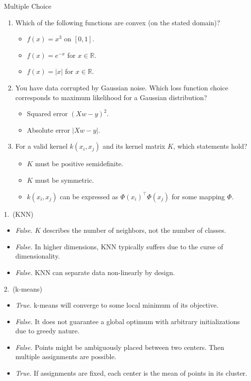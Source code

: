 \documentclass{article}
\begin{document}
\begin{exercise}{Multiple Choice}
\begin{enumerate}
    \item Which of the following functions are convex (on the stated domain)?
      \begin{itemize}
        \item $f(x) = x^3$ on $[0,1]$.
        \item $f(x) = e^{-x}$ for $x \in \mathbb{R}$.
        \item $f(x) = |x|$ for $x \in \mathbb{R}$.
      \end{itemize}

    \item You have data corrupted by Gaussian noise. Which loss function choice corresponds to maximum likelihood for a Gaussian distribution?
      \begin{itemize}
        \item Squared error $(Xw - y)^2$.
        \item Absolute error $|Xw - y|$.
      \end{itemize}

    \item For a valid kernel $k(x_i, x_j)$ and its kernel matrix $K$, which statements hold?
      \begin{itemize}
        \item $K$ must be positive semidefinite.
        \item $K$ must be symmetric.
        \item $k(x_i, x_j)$ can be expressed as $\Phi(x_i)^\top \Phi(x_j)$ for some mapping $\Phi$.
      \end{itemize}
  \end{enumerate}

  \begin{solution}
    1.\ (KNN)
    \begin{itemize}
      \item \emph{False.} $K$ describes the number of neighbors, not the number of classes.
      \item \emph{False.} In higher dimensions, KNN typically suffers due to the curse of dimensionality.
      \item \emph{False.} KNN can separate data non-linearly by design.
    \end{itemize}

    2.\ (k-means)
    \begin{itemize}
      \item \emph{True.} k-means will converge to some local minimum of its objective.
      \item \emph{False.} It does not guarantee a global optimum with arbitrary initializations due to greedy nature.
      \item \emph{False.} Points might be ambiguously placed between two centers. Then multiple assignments are possible.
      \item \emph{True.} If assignments are fixed, each center is the mean of points in its cluster.
    \end{itemize}


\end{solution}
\end{exercise}
\end{document}
